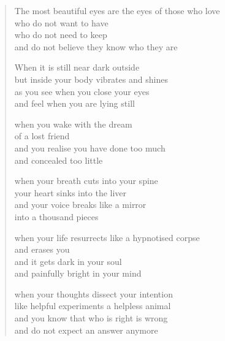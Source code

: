 \begin{verse}

The most beautiful eyes are the eyes of those who love\\
who do not want to have\\
who do not need to keep\\
and do not believe they know who they are

When it is still near dark outside\\
but inside your body vibrates and shines\\
as you see when you close your eyes\\
and feel when you are lying still

when you wake with the dream\\
of a lost friend\\
and you realise you have done too much\\
and concealed too little

when your breath cuts into your spine\\
your heart sinks into the liver\\
and your voice breaks like a mirror\\
into a thousand pieces

when your life resurrects like a hypnotised corpse\\
and erases you\\
and it gets dark in your soul\\
and painfully bright in your mind

when your thoughts dissect your intention\\
like helpful experiments a helpless animal\\
and you know that who is right is wrong\\
and do not expect an answer anymore

\end{verse}


